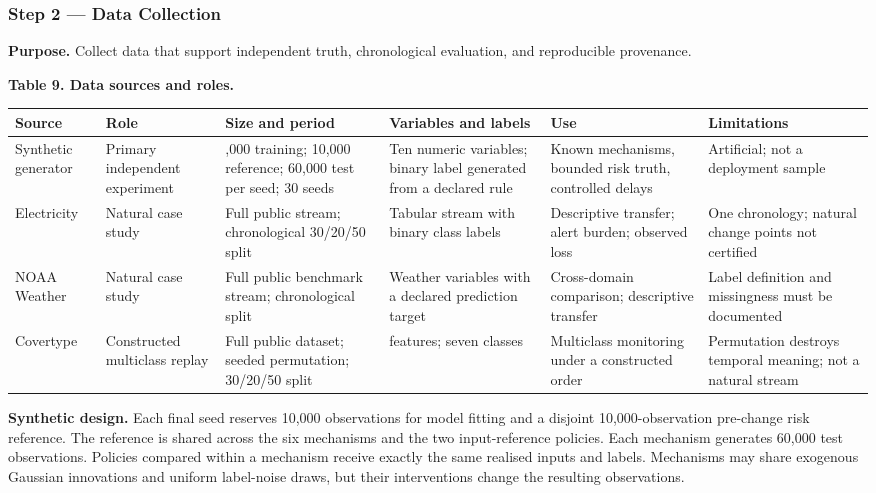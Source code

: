 \documentclass[
]{article}
\begin{document}
\hypertarget{step-2-data-collection}{%
\subsubsection{Step 2 --- Data
Collection}\label{step-2-data-collection}}

\textbf{Purpose.} Collect data that support independent truth,
chronological evaluation, and reproducible provenance.

\textbf{Table 9. Data sources and roles.}

\begin{longtable}[]{@{}
  >{\raggedright\arraybackslash}p{}
  >{\raggedright\arraybackslash}p{}
  >{\raggedright\arraybackslash}p{}
  >{\raggedright\arraybackslash}p{}
  >{\raggedright\arraybackslash}p{}
  >{\raggedright\arraybackslash}p{}@{}}
\toprule
Source & Role & Size and period & Variables and labels & Use &
Limitations \\
\midrule
\endhead
Synthetic generator & Primary independent experiment & 10,000 training;
10,000 reference; 60,000 test per seed; 30 seeds & Ten numeric
variables; binary label generated from a declared rule & Known
mechanisms, bounded risk truth, controlled delays & Artificial; not a
deployment sample \\
Electricity & Natural case study & Full public stream; chronological
30/20/50 split & Tabular stream with binary class labels & Descriptive
transfer; alert burden; observed loss & One chronology; natural change
points not certified \\
NOAA Weather & Natural case study & Full public benchmark stream;
chronological split & Weather variables with a declared prediction
target & Cross-domain comparison; descriptive transfer & Label
definition and missingness must be documented \\
Covertype & Constructed multiclass replay & Full public dataset; seeded
permutation; 30/20/50 split & 54 features; seven classes & Multiclass
monitoring under a constructed order & Permutation destroys temporal
meaning; not a natural stream \\
\bottomrule
\end{longtable}

\textbf{Synthetic design.} Each final seed reserves 10,000 observations
for model fitting and a disjoint 10,000-observation pre-change risk
reference. The reference is shared across the six mechanisms and the two
input-reference policies. Each mechanism generates 60,000 test
observations. Policies compared within a mechanism receive exactly the
same realised inputs and labels. Mechanisms may share exogenous Gaussian
innovations and uniform label-noise draws, but their interventions
change the resulting observations.
\end{document}

